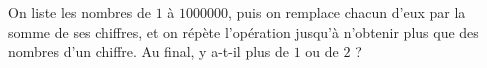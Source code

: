 On liste les nombres de $1$ à $1000000$, puis on remplace chacun d'eux par la somme de ses chiffres, et on répète l'opération jusqu'à n'obtenir plus que des nombres d'un chiffre. Au final, y a-t-il plus de $1$ ou de $2$ ?
